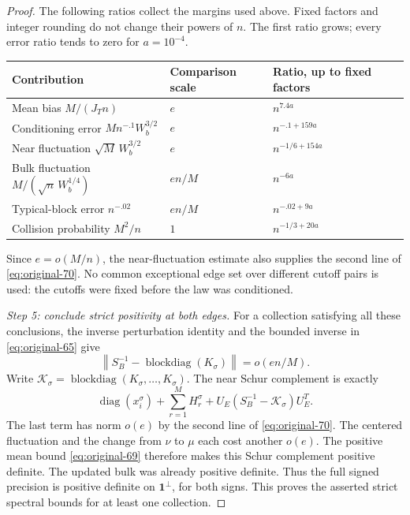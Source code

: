 \begin{proof}
The following ratios collect the margins used above.  Fixed factors and
integer rounding do not change their powers of $n$.  The first ratio grows;
every error ratio tends to zero for $a=10^{-4}$.
\begin{center}
\small
\begin{tabular}{@{}lll@{}}
\toprule
Contribution&Comparison scale&Ratio, up to fixed factors\\
\midrule
Mean bias $M/(J_Tn)$&$e$&$n^{7.4a}$\\
Conditioning error $Mn^{-.1}W_b^{3/2}$&$e$&$n^{-.1+159a}$\\
Near fluctuation $\sqrt M\,W_b^{3/2}$&$e$&$n^{-1/6+154a}$\\
Bulk fluctuation $M/(\sqrt n\,W_b^{1/4})$&$en/M$&$n^{-6a}$\\
Typical-block error $n^{-.02}$&$en/M$&$n^{-.02+9a}$\\
Collision probability $M^2/n$&$1$&$n^{-1/3+20a}$\\
\bottomrule
\end{tabular}
\end{center}
Since $e=o(M/n)$, the near-fluctuation estimate also supplies the
second line of \eqref{eq:original-70}.  No common exceptional edge set over
different cutoff pairs is used: the cutoffs were fixed before the law
was conditioned.

\par\smallskip\noindent\textit{Step 5: conclude strict positivity at both edges.}\quad
For a collection satisfying all these conclusions, the inverse perturbation
identity and the bounded inverse in \eqref{eq:original-65} give
\[
 \left\|S_B^{-1}-\operatorname{blockdiag}(K_\sigma)\right\|
 =o(en/M).
\]
Write $\mathcal K_\sigma=\operatorname{blockdiag}(K_\sigma,\ldots,K_\sigma)$.
The near Schur complement is exactly
\[
 \operatorname{diag}(x_i^\sigma)+\sum_{r=1}^M H_r^\sigma
       +U_E(S_B^{-1}-\mathcal K_\sigma)U_E^T.
\]
The last term has norm $o(e)$ by the second line of
\eqref{eq:original-70}.  The centered fluctuation and the change from
$\nu$ to $\mu$ each cost another $o(e)$.  The positive mean bound
\eqref{eq:original-69} therefore makes this Schur complement positive
definite.
The updated bulk was already positive definite.  Thus the full signed
precision is positive definite on $\mathbf 1^\perp$, for both signs.
This proves the asserted strict spectral bounds for at least one collection.


\end{proof}
